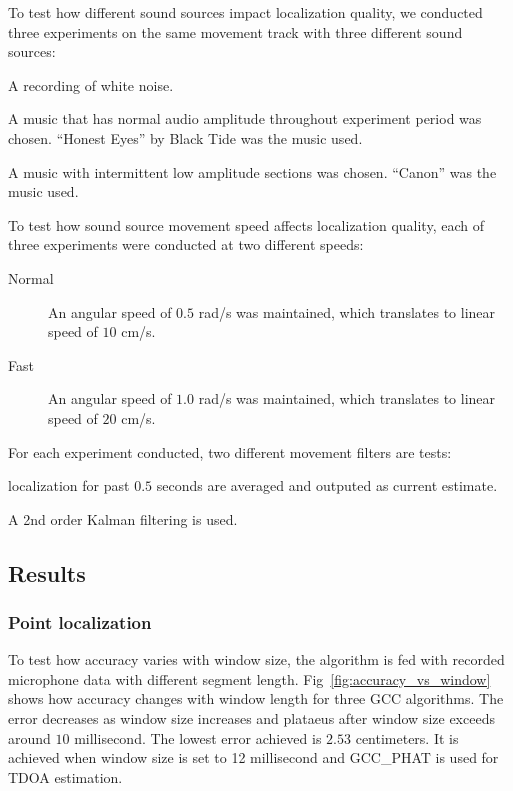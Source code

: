 To test how different sound sources impact localization quality, we conducted three experiments on the same movement track with three different sound sources:

\begin{description}

\item[White Noise] A recording of white noise.

\item[Music A] A music that has normal audio amplitude throughout experiment period was chosen. ``Honest Eyes'' by Black Tide was the music used.

\item[Music B] A music with intermittent low amplitude sections was chosen. ``Canon'' was the music used.

\end{description} 

To test how sound source movement speed affects localization quality, each of three experiments were conducted at two different speeds:
\begin{description}
\item[Normal] An angular speed of $0.5$ rad/s was maintained, which translates to linear speed of $10$ cm/s.
\item[Fast] An angular speed of $1.0$ rad/s was maintained, which translates to linear speed of $20$ cm/s.
\end{description}

For each experiment conducted, two different movement filters are tests:
\begin{description}
\item[Averaging filter] localization for past $0.5$ seconds are averaged and outputed as current estimate.
\item[Kalman filter] A 2nd order Kalman filtering is used.
\end{description}

\subsection{Results}
\subsubsection{Point localization}

To test how accuracy varies with window size, the algorithm is fed with recorded microphone data with different segment length. Fig~\ref{fig:accuracy_vs_window} shows how accuracy changes with window length for three GCC algorithms. The error decreases as window size increases and plataeus after window size exceeds around $10$ millisecond. The lowest error achieved is $2.53$ centimeters. It is achieved when window size is set to 12 millisecond and GCC\_PHAT is used for TDOA estimation.

